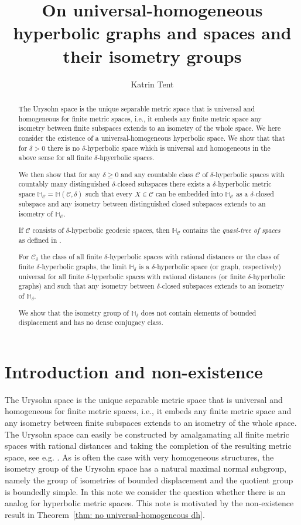 \documentclass{amsart}
\renewcommand{\d}{\delta}
\renewcommand{\H}{\mathbb{H}}
\newcommand{\C}{\mathcal{C}}
\begin{document}
\author{Katrin Tent}
\title{On universal-homogeneous hyperbolic graphs and spaces and their isometry groups}
\begin{abstract}
The Urysohn space is the unique separable metric space that is universal and homogeneous for finite metric spaces, i.e., it embeds any finite metric space  any isometry between finite subspaces extends to an isometry of the whole space. We here consider the existence of a universal-homogeneous hyperbolic space. We show that 
 that for $\delta>0$ there is no $\delta$-hyperbolic space which is universal and homogeneous in the above sense for all finite $\delta$-hpyerbolic spaces. 
 
We then show that for any $\delta\geq 0$ and any countable class $\C$ of $\d$-hyperbolic spaces with countably many distinguished   $\d$-closed subspaces there exists a $\d$-hyperbolic metric space $\H_\C=\H(\C,\delta)$ such that every $X\in \C$ can be embedded into $\H_\C$ as a   $\d$-closed subspace and any isometry between distinguished closed subspaces extends to an isometry of $\H_\C$. 


If $\C$ consists of $\d$-hyperbolic geodesic spaces, then $\H_\C$ contains the \emph{quasi-tree of spaces} as defined in \cite{Bestvina}.

For $\C_\d$ the class of all finite $\d$-hyperbolic spaces with rational distances or the class  of finite $\d$-hyperbolic graphs, the limit $\H_\d$ is a $\d$-hyperbolic space (or graph, respectively) universal for all finite $\d$-hyperbolic spaces with rational distances (or finite $\d$-hyperbolic graphs) and such that any isometry between   $\d$-closed subspaces extends to an isometry of $\H_\d$. 



We show that the isometry group of $\H_\d$ does not contain elements of bounded displacement and  has no dense conjugacy class.
\end{abstract}

\maketitle
\section{Introduction and non-existence}

The Urysohn space is the unique separable metric space that is universal and homogeneous for finite metric spaces, i.e., it embeds any finite metric space  and any isometry between finite subspaces extends to an isometry of the whole space. The Urysohn space can easily be constructed by amalgamating all finite metric spaces with rational distances and taking the completion of the resulting metric space, see e.g. \cite{TZ}. As is often the case with very homogeneous structures, the isometry group of the Urysohn space has a natural maximal normal subgroup, namely the group of isometries of bounded displacement and the quotient group is boundedly simple. In this note we consider the question whether there is an analog for hyperbolic metric spaces.
This note is motivated by the non-existence result in Theorem~\ref{thm: no universal-homogeneous dh}.
\end{document}
